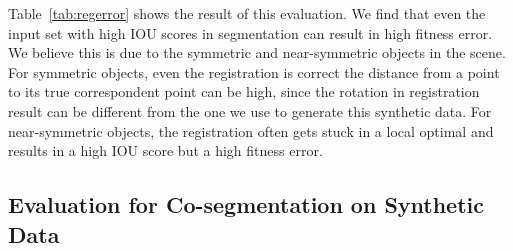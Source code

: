 Table~\ref{tab:regerror} shows the result of this evaluation.
%
We find that even the input set with high IOU scores in segmentation can result in high fitness error. We believe this is due to the symmetric and near-symmetric objects in the scene. For symmetric objects, even the registration is correct the distance from a point to its true correspondent point can be high, since the rotation in registration result can be different from the one we use to generate this synthetic data. For near-symmetric objects, the registration often gets stuck in a local optimal and results in a high IOU score but a high fitness error.


\subsection{Evaluation for Co-segmentation on Synthetic Data}



